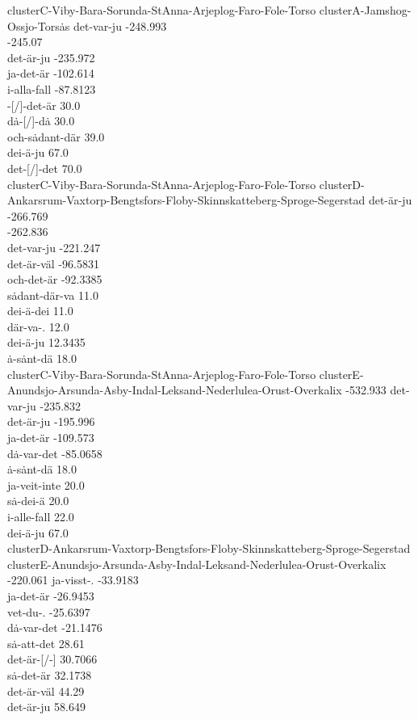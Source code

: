 clusterC-Viby-Bara-Sorunda-StAnna-Arjeplog-Faro-Fole-Torso
clusterA-Jamshog-Ossjo-Tors\.as
det-var-ju -248.993 \\
 -245.07 \\
det-\"ar-ju -235.972 \\
ja-det-\"ar -102.614 \\
i-alla-fall -87.8123 \\
 -[/]-det-\"ar 30.0 \\
d\.a-[/]-d\.a 30.0 \\
och-s\.adant-d\"ar 39.0 \\
dei-\"a-ju 67.0 \\
det-[/]-det 70.0 \\


clusterC-Viby-Bara-Sorunda-StAnna-Arjeplog-Faro-Fole-Torso
clusterD-Ankarsrum-Vaxtorp-Bengtsfors-Floby-Skinnskatteberg-Sproge-Segerstad
det-\"ar-ju -266.769 \\
 -262.836 \\
det-var-ju -221.247 \\
det-\"ar-v\"al -96.5831 \\
och-det-\"ar -92.3385 \\
s\.adant-d\"ar-va 11.0 \\
dei-\"a-dei 11.0 \\
d\"ar-va-. 12.0 \\
dei-\"a-ju 12.3435 \\
\.a-s\.ant-d\"a 18.0 \\


clusterC-Viby-Bara-Sorunda-StAnna-Arjeplog-Faro-Fole-Torso
clusterE-Anundsjo-Arsunda-Asby-Indal-Leksand-Nederlulea-Orust-Overkalix
 -532.933
det-var-ju -235.832 \\
det-\"ar-ju -195.996 \\
ja-det-\"ar -109.573 \\
d\.a-var-det -85.0658 \\
\.a-s\.ant-d\"a 18.0 \\
ja-veit-inte 20.0 \\
s\.a-dei-\"a 20.0 \\
i-alle-fall 22.0 \\
dei-\"a-ju 67.0 \\


clusterD-Ankarsrum-Vaxtorp-Bengtsfors-Floby-Skinnskatteberg-Sproge-Segerstad
clusterE-Anundsjo-Arsunda-Asby-Indal-Leksand-Nederlulea-Orust-Overkalix
 -220.061
ja-visst-. -33.9183 \\
ja-det-\"ar -26.9453 \\
vet-du-. -25.6397 \\
d\.a-var-det -21.1476 \\
s\.a-att-det 28.61 \\
det-\"ar-[/-] 30.7066 \\
s\.a-det-\"ar 32.1738 \\
det-\"ar-v\"al 44.29 \\
det-\"ar-ju 58.649 \\

